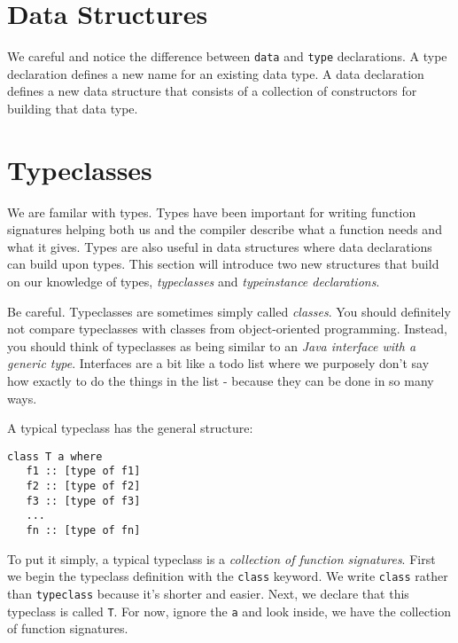 

\chapter{Data Structures}


We careful and notice the difference between \lstinline{data} and \lstinline{type} declarations.
A type declaration defines a new name for an existing data type.
A data declaration defines a new data structure that consists of a collection of constructors for building that data type.


\chapter{Typeclasses}

We are familar with types. Types have been important for writing function 
signatures helping both us and the compiler describe what a function needs and what it gives.
Types are also useful in data structures where data declarations can build upon types. 	
This section will introduce two new structures that build on our knowledge of types, 
\textit{typeclasses} and \textit{typeinstance declarations}. 


Be careful. Typeclasses are sometimes simply called \textit{classes}. 
You should definitely not compare typeclasses with 
classes from object-oriented programming. Instead, you should think of typeclasses 
as being similar to an \textit{Java interface with a generic type}. 
Interfaces are a bit like a todo list where we purposely don't say how exactly 
to do the things in the list - because they can be done in so many ways. 

A typical typeclass has the general structure:

\begin{lstlisting}
class T a where
   f1 :: [type of f1]
   f2 :: [type of f2]
   f3 :: [type of f3]
   ...
   fn :: [type of fn]
\end{lstlisting}

To put it simply, a typical typeclass is a \textit{collection of function signatures}.
First we begin the typeclass definition with the \lstinline{class} keyword.
We write \lstinline{class} rather than \lstinline{typeclass} because it's shorter and easier.
Next, we declare that this typeclass is called \lstinline{T}. 
For now, ignore the \lstinline{a} and look inside, we have the collection of function signatures. 


